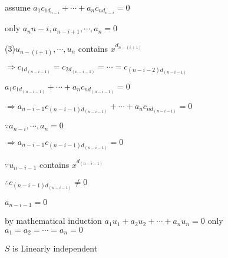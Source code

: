 \begin{tcolorbox}
\begin{solution}
		assume $a_1c_{1d_{n-i}}+\cdots+a_nc_{nd_{n-i}} = 0$
		
		only $a_n{n-i},a_{n-i+1},\cdots,a_n = 0$
		
		(3)$u_{n-(i+1)},\cdots,u_n$ contains $x^{d_{n-(i+1)}}$
		
		$\Rightarrow c_{1d_{(n-i-1)}} = c_{2d_{(n-i-1)}} = \cdots = c_{(n-i-2)d_{(n-i-1)}}$
		
		$a_1c_{1d_{(n-i-1)}} + \cdots + a_nc_{nd_{(n-i-1)}} = 0$
		
		$\Rightarrow a_{n-i-1}c_{(n-i-1)d_{(n-i-1)}} + \cdots + a_nc_{nd_{(n-i-1)}} = 0$
		
		$\because a_{n-i},\cdots,a_n = 0$
		
		$\Rightarrow a_{n-i-1}c_{(n-i-1)d_{(n-i-1)}} = 0$
		
		$\because u_{n-i-1}$ contains $x^{d_{(n-i-1)}}$
		
		$\therefore c_{(n-i-1)d_{(n-i-1)}} \neq 0$
		
		$a_{n-i-1} = 0$
		
		by mathematical induction $a_1u_1+a_2u_2+\cdots+a_nu_n=0$ only $a_1 = a_2 = \cdots = a_n = 0$
		
		$S$ is Linearly independent
	\end{solution}
\end{tcolorbox}